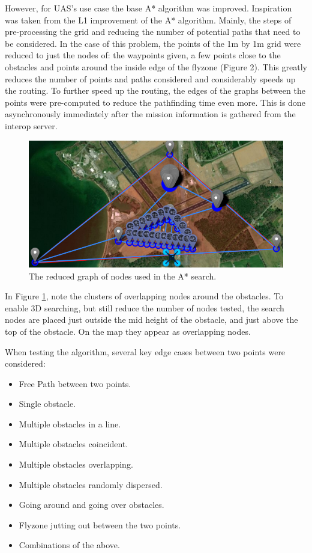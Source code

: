 However, for UAS's use case the base A* algorithm was improved. Inspiration was taken from the L1 improvement of the A* algorithm. Mainly, the steps of pre-processing the grid and reducing the number of potential paths that need to be considered. In the case of this problem, the points of the 1m by 1m grid were reduced to just the nodes of: the waypoints given, a few points close to the obstacles and points around the inside edge of the flyzone (Figure 2). This greatly reduces the number of points and paths considered and considerably speeds up the routing. To further speed up the routing, the edges of the graphs between the points were pre-computed to reduce the pathfinding time even more. This is done asynchronously immediately after the mission information is gathered from the interop server.

\begin{figure}[h]\centering
\includegraphics[width=\linewidth]{figures/OA_2.png}
\caption{The reduced graph of nodes used in the A* search.}
\label{fig:OA_2}
\end{figure}

In Figure \ref{fig:OA_2}, note the clusters of overlapping nodes around the obstacles. To enable 3D searching, but still reduce the number of nodes tested, the search nodes are placed just outside the mid height of the obstacle, and just above the top of the obstacle. On the map they appear as overlapping nodes.

When testing the algorithm, several key edge cases between two points were considered:
\begin{itemize}
\item Free Path between two points.
\item Single obstacle.
\item Multiple obstacles in a line.
\item Multiple obstacles coincident.
\item Multiple obstacles overlapping.
\item Multiple obstacles randomly dispersed.
\item Going around and going over obstacles.
\item Flyzone jutting out between the two points.
\item Combinations of the above.
\end{itemize}

\endinput


